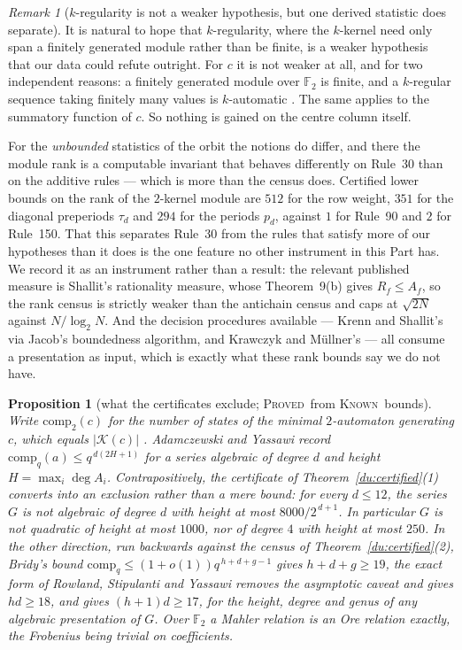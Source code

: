 \documentclass[11pt]{article}
\newtheorem{proposition}[theorem]{Proposition}
\theoremstyle{definition}
\theoremstyle{remark}
\newtheorem{remark}[theorem]{Remark}
\newcommand{\F}{\mathbb{F}_2}
\newcommand{\PROVED}{\textsc{Proved}}
\newcommand{\KNOWN}{\textsc{Known}}
\begin{document}
\begin{remark}[$k$-regularity is not a weaker hypothesis, but one derived statistic does separate]\label{du:regular}
It is natural to hope that $k$-regularity, where the $k$-kernel need only span a finitely generated
module rather than be finite, is a weaker hypothesis that our data could refute outright. For $c$ it is
not weaker at all, and for two independent reasons: a finitely generated module over $\F$ is finite, and
a $k$-regular sequence taking finitely many values is $k$-automatic \cite[p.~441]{AS}. The same applies
to the summatory function of $c$. So nothing is gained on the centre column itself.

For the \emph{unbounded} statistics of the orbit the notions do differ, and there the module rank is a
computable invariant that behaves differently on Rule~30 than on the additive rules --- which is more
than the census does. Certified lower bounds on the rank of the $2$-kernel module are $512$ for the row
weight, $351$ for the diagonal preperiods $\tau_d$ and $294$ for the periods $p_d$, against $1$ for
Rule~90 and $2$ for Rule~150. That this separates Rule~30 from the rules that satisfy more of our
hypotheses than it does is the one feature no other instrument in this Part has. We record it as an
instrument rather than a result: the relevant published measure is Shallit's rationality measure, whose
Theorem~9(b) gives $R_f\le A_f$, so the rank census is strictly weaker than the antichain census and
caps at $\sqrt{2N}$ against $N/\log_2 N$. And the decision procedures available --- Krenn and Shallit's
via Jacob's boundedness algorithm, and Krawczyk and M\"ullner's \cite{KrawczykMullner} --- all consume a presentation as input,
which is exactly what these rank bounds say we do not have.
\end{remark}

\begin{proposition}[what the certificates exclude; \PROVED\ from \KNOWN\ bounds]\label{du:convert}
Write $\mathrm{comp}_2(c)$ for the number of states of the minimal $2$-automaton generating $c$, which
equals $|\mathcal K(c)|$ \cite[Cor.~4.1.9, Thm.~6.6.2]{AS}. Adamczewski and Yassawi \cite{AY} record
$\mathrm{comp}_q(a)\le q^{\,d(2H+1)}$ for a series algebraic of degree $d$ and height
$H=\max_i\deg A_i$. Contrapositively, the certificate of Theorem~\ref{du:certified}(1) converts into an
exclusion rather than a mere bound: for every $d\le12$, the series $G$ is not algebraic of degree $d$
with height at most $8000/2^{\,d+1}$. In particular $G$ is not quadratic of height at most $1000$, nor
of degree $4$ with height at most $250$. In the other direction, run backwards against the census of Theorem~\ref{du:certified}(2), Bridy's bound \cite{Bridy} $\mathrm{comp}_q\le(1+o(1))q^{\,h+d+g-1}$ gives $h+d+g\ge19$, the exact form of Rowland, Stipulanti and Yassawi removes the asymptotic caveat and gives $hd\ge18$, and \cite[eq.~5]{AY} gives $(h+1)d\ge17$, for the height, degree and genus of any algebraic presentation of $G$. Over $\F$ a Mahler relation is an Ore relation exactly, the Frobenius being trivial on coefficients.
\end{proposition}
\end{document}
